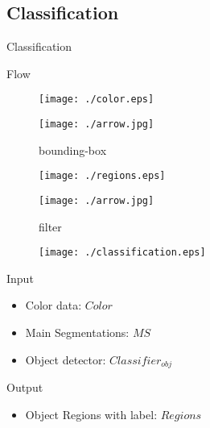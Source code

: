 \documentclass[xcolor=table,compress,blue]{beamer}
\begin{document}
\subsection{Classification}
\begin{frame}{Classification}
	\begin{exampleblock}{Flow}
		\begin{figure}[htpb]
			\centering
			\begin{minipage}[b]{0.8in}
				\centerline{ \texttt{[image: ./color.eps]} }
			\end{minipage}
			\begin{minipage}[b]{0.8in}
				\centerline{ \texttt{[image: ./arrow.jpg]} }
				\centerline{\tiny{bounding-box}}
			\end{minipage}
			\begin{minipage}[b]{0.8in}
				\centerline{ \texttt{[image: ./regions.eps]} }
			\end{minipage}
			\begin{minipage}[b]{0.8in}
				\centerline{ \texttt{[image: ./arrow.jpg]} }
				\centerline{\tiny{filter}}
			\end{minipage}
			\begin{minipage}[b]{0.8in}
				\centerline{ \texttt{[image: ./classification.eps]} }
			\end{minipage}
		\end{figure}
	\end{exampleblock}
	\begin{exampleblock}{Input}
		\begin{itemize}		
			\item Color data: $Color$	
			\item Main Segmentations: $MS$ 
			\item Object detector: ${Classifier}_{obj}$
		\end{itemize}
	\end{exampleblock}
	\begin{exampleblock}{Output}
		\begin{itemize}
			\item Object Regions with label: $Regions$
		\end{itemize}
	\end{exampleblock}
\end{frame}
\end{document}
